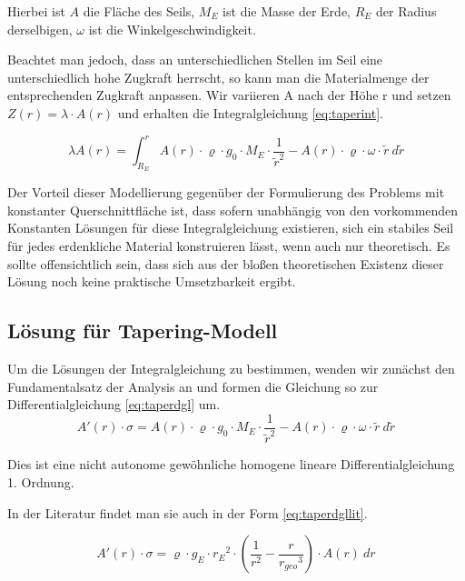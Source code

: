 \documentclass[a4paper, 10pt]{report}
\begin{document}
Hierbei ist $A$ die Fläche des Seils, $M_E$ ist die Masse der Erde, $R_E$ der Radius derselbigen, $\omega$ ist die Winkelgeschwindigkeit.

Beachtet man jedoch, dass an unterschiedlichen Stellen im Seil eine unterschiedlich hohe Zugkraft herrscht, so kann man die Materialmenge der entsprechenden Zugkraft anpassen.
Wir variieren A nach der Höhe r und setzen $Z(r) = \lambda \cdot A(r)$ und erhalten die Integralgleichung \ref{eq:taperint}.

\begin{equation}
\lambda A(r) = \int_{R_E}^{r} A(r) \cdot \varrho \cdot g_0 \cdot M_E \cdot \frac{1}{\tilde{r}^2} - A(r) \cdot \varrho \cdot \omega \cdot \tilde{r}\ d\tilde{r}
\label{eq:taperint}
\end{equation}


Der Vorteil dieser Modellierung gegenüber der Formulierung des Problems mit konstanter Querschnittfläche ist, dass sofern unabhängig von den vorkommenden Konstanten Lösungen für diese Integralgleichung existieren, sich ein stabiles Seil für jedes erdenkliche Material konstruieren lässt, wenn auch nur theoretisch. Es sollte offensichtlich sein, dass sich aus der bloßen theoretischen Existenz dieser Lösung noch keine praktische Umsetzbarkeit ergibt.

\subsection{Lösung für Tapering-Modell}

Um die Lösungen der Integralgleichung zu bestimmen, wenden wir zunächst den Fundamentalsatz der Analysis an und formen die Gleichung so zur Differentialgleichung \ref{eq:taperdgl} um.
\begin{equation}
A'(r) \cdot \sigma = A(r) \cdot \varrho \cdot g_0 \cdot M_E \cdot \frac{1}{\tilde{r}^2} - A(r) \cdot \varrho \cdot \omega \cdot \tilde{r}\ d\tilde{r}
\label{eq:taperdgl}
\end{equation}

Dies ist eine nicht autonome gewöhnliche homogene lineare Differentialgleichung 1. Ordnung.


In der Literatur\cite{PE75} findet man sie auch in der Form \ref{eq:taperdgllit}.

\begin{equation}
A'(r) \cdot \sigma = \varrho \cdot g_E \cdot {r_E}^2 \cdot (\frac{1}{r^2} - \frac{r}{{r_{geo}}^3}) \cdot A(r)\ dr
\label{eq:taperdgllit}
\end{equation}
\end{document}

